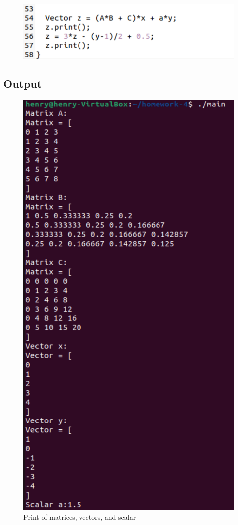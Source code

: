 \documentclass[10pt,a4paper]{article}
\begin{document}
\begin{figure}[!ht]
        \centering \includegraphics[scale=1]{figures/code2.png}
\end{figure}
\subsection{Output}
\begin{figure}[!ht]
        \centering \includegraphics[scale=1]{figures/output1.png}
        \caption{Print of matrices, vectors, and scalar}
\end{figure}
\end{document}
